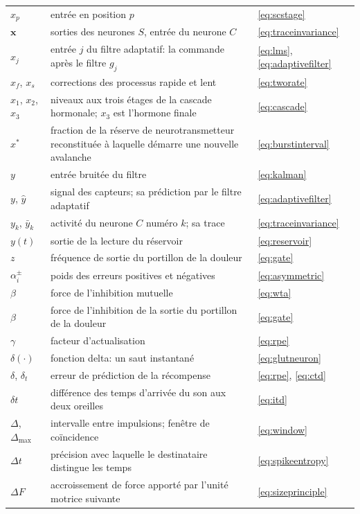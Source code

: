\begin{center}
\begin{longtable}{>{\raggedright}p{2.0cm}>{\raggedright}p{9.6cm}>{\raggedright\arraybackslash}p{2.4cm}}
$x_p$ & entrée en position $p$ & \eqref{eq:scstage} \\
$\mathbf x$ & sorties des neurones $S$, entrée du neurone $C$ & \eqref{eq:traceinvariance} \\
$x_j$ & entrée $j$ du filtre adaptatif: la commande après le filtre $g_j$ & \eqref{eq:lms}, \eqref{eq:adaptivefilter} \\
$x_f$, $x_s$ & corrections des processus rapide et lent & \eqref{eq:tworate} \\
$x_1$, $x_2$, $x_3$ & niveaux aux trois étages de la cascade hormonale; $x_3$ est l'hormone finale & \eqref{eq:cascade} \\
$x^*$ & fraction de la réserve de neurotransmetteur reconstituée à laquelle démarre une nouvelle avalanche & \eqref{eq:burstinterval} \\
$y$ & entrée bruitée du filtre & \eqref{eq:kalman} \\
$y$, $\hat y$ & signal des capteurs; sa prédiction par le filtre adaptatif & \eqref{eq:adaptivefilter} \\
$y_k$, $\bar y_k$ & activité du neurone $C$ numéro $k$; sa trace & \eqref{eq:traceinvariance} \\
$y(t)$ & sortie de la lecture du réservoir & \eqref{eq:reservoir} \\
$z$ & fréquence de sortie du portillon de la douleur & \eqref{eq:gate} \\
\midrule
$\alpha_i^\pm$ & poids des erreurs positives et négatives & \eqref{eq:asymmetric} \\
$\beta$ & force de l'inhibition mutuelle & \eqref{eq:wta} \\
$\beta$ & force de l'inhibition de la sortie du portillon de la douleur & \eqref{eq:gate} \\
$\gamma$ & facteur d'actualisation & \eqref{eq:rpe} \\
$\delta(\cdot)$ & fonction delta: un saut instantané & \eqref{eq:glutneuron} \\
$\delta$, $\delta_t$ & erreur de prédiction de la récompense & \eqref{eq:rpe}, \eqref{eq:ctd} \\
$\delta t$ & différence des temps d'arrivée du son aux deux oreilles & \eqref{eq:itd} \\
$\Delta$, $\Delta_{\max}$ & intervalle entre impulsions; fenêtre de coïncidence & \eqref{eq:window} \\
$\Delta t$ & précision avec laquelle le destinataire distingue les temps & \eqref{eq:spikeentropy} \\
$\Delta F$ & accroissement de force apporté par l'unité motrice suivante & \eqref{eq:sizeprinciple} \\

\end{longtable}
\end{center}

